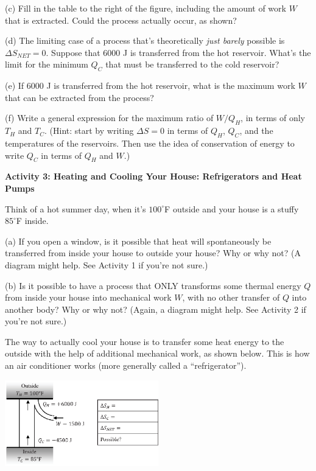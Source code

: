 (c) Fill in the table to the right of the figure, including the amount of work $W$ that is extracted.  Could the process actually occur, as shown?
\answerspace{0.2 in}

(d) The limiting case of a process that's theoretically \textit{just barely} possible is $\Delta S_{NET} = 0$.  Suppose that 6000 J is transferred from the hot reservoir.  What's the limit for the minimum $Q_C$ that must be transferred to the cold reservoir?
\answerspace{0.4 in}

(e) If  6000 J is transferred from the hot reservoir, what is the maximum work $W$ that can be extracted from the process?
\answerspace{0.4 in}

\pagebreak[2]
(f) Write a general expression for the maximum ratio of $W/Q_H$, in terms of only $T_H$ and $T_C$.  (Hint: start by writing $\Delta S = 0$ in terms of $Q_H$, $Q_C$, and the temperatures of the reservoirs.  Then use the idea of conservation of energy to write $Q_C$ in terms of $Q_H$ and $W$.)
\answerspace{1.5 in}

\textbf{Activity 3: Heating and Cooling Your House: Refrigerators and Heat Pumps}

Think of a hot summer day, when it's $100^\circ$F outside and your house is a stuffy $85^\circ$F inside.  

(a) If you open a window, is it possible that heat will spontaneously be transferred from inside your house to outside your house?  Why or why not?  (A diagram might help.  See Activity 1 if you're not sure.)
\answerspace{1.2 in}

(b) Is it possible to have a process that ONLY transforms some thermal energy $Q$ from inside your house into mechanical work $W$, with no other transfer of $Q$ into another body?  Why or why not?  (Again, a diagram might help.  See Activity 2 if you're not sure.)
\answerspace{1.2 in}

The way to actually cool your house is to transfer some heat energy to the outside with the help of additional mechanical work, as shown below.  This is how an air conditioner works (more generally called a ``refrigerator'').

\begin{center}
\vspace{-0.3 in}
\includegraphics[width=0.5\textwidth]{entropy_is_it_possible/fig6.eps}
\vspace{-0.4 in}
\end{center}

